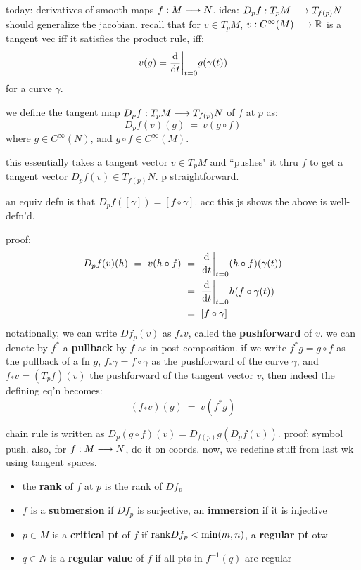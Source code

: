 
today: derivatives of smooth maps $f:M\longrightarrow N$.
idea: $D_{p}f:T_{p}M\longrightarrow T_{f(p)}N$ should generalize the jacobian.
recall that for $v\in T_{p}M$, $v:C^{\infty}(M)\longrightarrow\mathbb{R}$ is a tangent vec iff
it satisfies the product rule, iff:
\begin{equation*}
	v(g)=\frac{\textrm{d}}{\textrm{d} t}\bigg\rvert_{t=0}g(\gamma(t))
\end{equation*}
for a curve $\gamma$.
\begin{defn}
	we define the tangent map $D_{p}f:T_{p}M\longrightarrow T_{f(p)}N$ of $f$ at $p$ as:
	\begin{equation*}
		D_{p}f(v)(g) \ = \ v(g\circ f)
	\end{equation*}
	where $g\in C^{\infty}(N)$, and $g\circ f\in C^{\infty}(M)$.
\end{defn}
this essentially takes a tangent vector $v\in T_{p}M$ and ``pushes" it thru
$f$ to get a tangent vector $D_{p}f(v)\in T_{f(p)}N$. p straightforward.

\begin{prop}
	an equiv defn is that $D_{p}f([\gamma])=[f\circ\gamma]$.
	acc this js shows the above is well-defn'd.
\end{prop}
proof: \vspace{-0.3in}
\begin{align*}
	D_{p}f(v)(h) \ = \ v(h\circ f)
	& \ = \ \frac{\textrm{d}}{\textrm{d} t}\bigg\rvert_{t=0}(h\circ f)(\gamma(t)) \\
	& \ = \ \frac{\textrm{d}}{\textrm{d} t}\bigg\rvert_{t=0}h(f\circ\gamma(t)) \\
	& \ = \ [f\circ\gamma]
\end{align*}
notationally, we can write $Df_{p}(v)$ as $f_{*}v$, called the \textbf{pushforward} of $v$.
we can denote by $f^{*}$ a \textbf{pullback} by $f$ as in post-composition.
if we write $f^{*}g=g\circ f$ as the pullback of a fn $g$, $f_{*}\gamma=f\circ\gamma$
as the pushforward of the curve $\gamma$, and $f_{*}v=(T_{p}f)(v)$ the pushforward
of the tangent vector $v$, then indeed the defining eq'n becomes:
\begin{equation*}
	(f_{*}v)(g) \ = \ v(f^{*}g)
\end{equation*}

chain rule is written as $D_{p}(g\circ f)(v)=D_{f(p)}g(D_{p}f(v))$.
proof: symbol push. also, for $f:M\longrightarrow N$, do it on coords.
now, we redefine stuff from last wk using tangent spaces.
\begin{itemize}
	\item the \textbf{rank} of $f$ at $p$ is the rank of $Df_{p}$
	\item $f$ is a \textbf{submersion} if $Df_{p}$ is surjective,
		an \textbf{immersion} if it is injective
	\item $p\in M$ is a \textbf{critical pt} of $f$ if $\textrm{rank}Df_{p}<\min(m,n)$,
		a \textbf{regular pt} otw
	\item $q\in N$ is a \textbf{regular value} of $f$ if all pts in $f^{-1}(q)$ are regular
\end{itemize}

